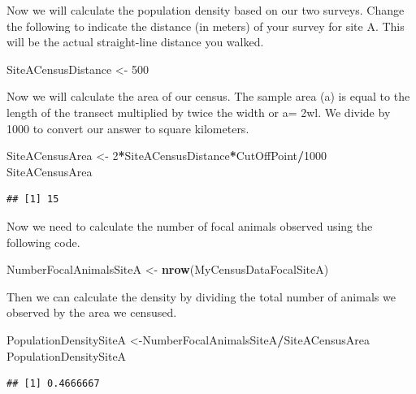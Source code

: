 \documentclass[]{book}
\newenvironment{Shaded}{\begin{snugshade}}{\end{snugshade}}
\newcommand{\DecValTok}[1]{\textcolor[rgb]{0.00,0.00,0.81}{#1}}
\newcommand{\KeywordTok}[1]{\textcolor[rgb]{0.13,0.29,0.53}{\textbf{#1}}}
\newcommand{\NormalTok}[1]{#1}
\newcommand{\OperatorTok}[1]{\textcolor[rgb]{0.81,0.36,0.00}{\textbf{#1}}}
\newcommand{\StringTok}[1]{\textcolor[rgb]{0.31,0.60,0.02}{#1}}
\begin{document}
Now we will calculate the population density based on our two surveys. Change the following to indicate the distance (in meters) of your survey for site A. This will be the actual straight-line distance you walked.

\begin{Shaded}
\begin{Highlighting}[]
\NormalTok{SiteACensusDistance <-}\StringTok{ }\DecValTok{500}
\end{Highlighting}
\end{Shaded}

Now we will calculate the area of our census. The sample area (a) is equal to the length of the transect multiplied by twice the width or a= 2wl. We divide by 1000 to convert our answer to square kilometers.

\begin{Shaded}
\begin{Highlighting}[]
\NormalTok{SiteACensusArea <-}\StringTok{ }\DecValTok{2}\OperatorTok{*}\NormalTok{SiteACensusDistance}\OperatorTok{*}\NormalTok{CutOffPoint}\OperatorTok{/}\DecValTok{1000}
\NormalTok{SiteACensusArea}
\end{Highlighting}
\end{Shaded}

\begin{verbatim}
## [1] 15
\end{verbatim}

Now we need to calculate the number of focal animals observed using the following code.

\begin{Shaded}
\begin{Highlighting}[]
\NormalTok{NumberFocalAnimalsSiteA <-}\StringTok{ }\KeywordTok{nrow}\NormalTok{(MyCensusDataFocalSiteA)}
\end{Highlighting}
\end{Shaded}

Then we can calculate the density by dividing the total number of animals we observed by the area we censused.

\begin{Shaded}
\begin{Highlighting}[]
\NormalTok{PopulationDensitySiteA <-NumberFocalAnimalsSiteA}\OperatorTok{/}\NormalTok{SiteACensusArea}
\NormalTok{PopulationDensitySiteA}
\end{Highlighting}
\end{Shaded}

\begin{verbatim}
## [1] 0.4666667
\end{verbatim}
\end{document}
